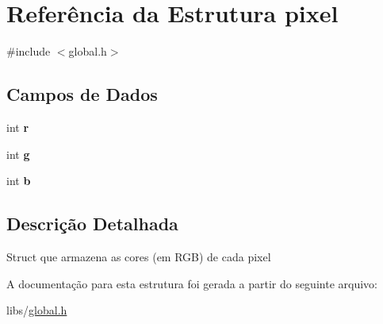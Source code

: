 \hypertarget{structpixel}{}\section{Referência da Estrutura pixel}
\label{structpixel}


{\ttfamily \#include $<$global.\+h$>$}

\subsection*{Campos de Dados}
\begin{DoxyCompactItemize}
\item 
int {\bfseries r}\hypertarget{structpixel_a2cc21269c11bd75b6da2249d177257f0}{}\label{structpixel_a2cc21269c11bd75b6da2249d177257f0}

\item 
int {\bfseries g}\hypertarget{structpixel_a6f4b39b225373a1404c8424c176f4006}{}\label{structpixel_a6f4b39b225373a1404c8424c176f4006}

\item 
int {\bfseries b}\hypertarget{structpixel_a25bc8317f2c216b3702d5fac2e6fc306}{}\label{structpixel_a25bc8317f2c216b3702d5fac2e6fc306}

\end{DoxyCompactItemize}


\subsection{Descrição Detalhada}
Struct que armazena as cores (em R\+GB) de cada pixel 

A documentação para esta estrutura foi gerada a partir do seguinte arquivo\+:\begin{DoxyCompactItemize}
\item 
libs/\hyperlink{global_8h}{global.\+h}\end{DoxyCompactItemize}
